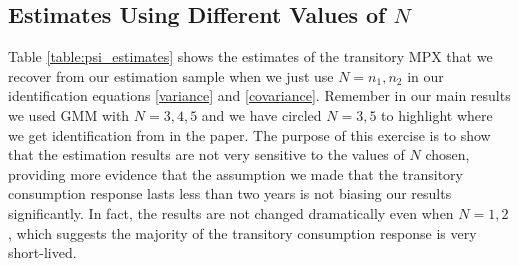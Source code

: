 \documentclass[titlepage]{\econtex}\newcommand{\texname}{ConsumptionHeterogeneity}
\begin{document}
	\subsection{Estimates Using Different Values of $N$}
	\begin{center}
		\label{table:psi_estimates}
		
	\end{center}
	Table \ref{table:psi_estimates} shows the estimates of the transitory MPX that we recover from our estimation sample when we just use $N=n_1,n_2$ in our identification equations \ref{variance} and \ref{covariance}. Remember in our main results we used GMM with $N=3,4,5$ and we have circled $N=3,5$ to highlight where we get identification from in the paper. The purpose of this exercise is to show that the estimation results are not very sensitive to the values of $N$ chosen, providing more evidence that the assumption we made that the transitory consumption response lasts less than two years is not biasing our results significantly. In fact, the results are not changed dramatically even when $N=1,2$, which suggests the majority of the transitory consumption response is very short-lived.
	
\end{document}
